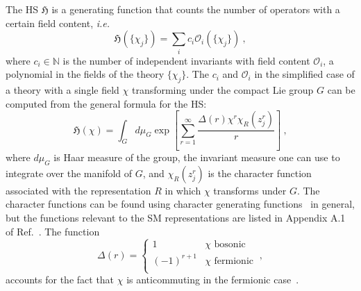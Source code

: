 The HS $\mathfrak{H}$ is a generating function that counts the number of
operators with a certain field content, \textit{i.e.}
\begin{equation}
  \mathfrak{H}(\{\chi_{j}\}) = \sum_{i} c_{i} \mathcal{O}_{i}(\{\chi_{j}\}) \ ,
\end{equation}
where $c_{i} \in \mathbb{N}$ is the number of independent invariants with field
content $\mathcal{O}_{i}$, a polynomial in the fields of the theory
$\{\chi_{j}\}$. The $c_{i}$ and $\mathcal{O}_{i}$ in the simplified case of a
theory with a single field $\chi$ transforming under the compact Lie group $G$
can be computed from the general formula for the HS:
\begin{equation}
  \label{eq:hs-g}
  \mathfrak{H}(\chi) = \int_{G} d\mu_{G} \exp \left[ \sum_{r=1}^{\infty} \frac{\Delta(r) \chi^{r} \chi_{R}(z_{j}^{r})}{r} \right] \ ,
\end{equation}
where $d\mu_{G}$ is Haar measure of the group, the invariant measure one can use
to integrate over the manifold of $G$, and $\chi_{R}(z_{j}^{r})$ is the
character function associated with the representation $R$ in which $\chi$
transforms under $G$. The character functions can be found using character
generating functions~\cite{Hanany:2014dia} in general, but the functions
relevant to the SM representations are listed in Appendix A.1 of
Ref.~\cite{Lehman:2015via}. The function
\begin{equation}
  \Delta(r) = \begin{cases}
    1 & \text{$\chi$ bosonic} \\
    (-1)^{r+1} & \text{$\chi$ fermionic} \\
  \end{cases} \ ,
\end{equation}
accounts for the fact that $\chi$ is anticommuting in the fermionic
case~\cite{Hanany:2014dia}.

